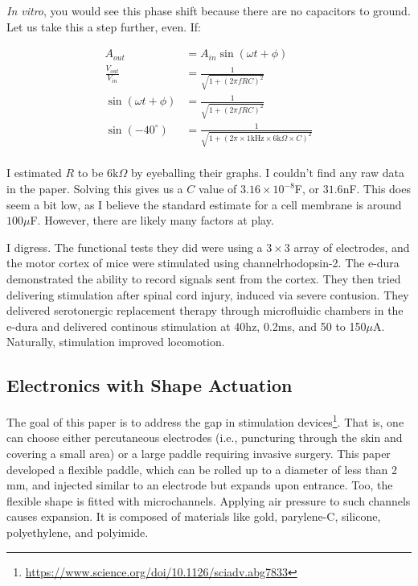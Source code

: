 \documentclass[12pt]{report}
\newcommand{\Vo}{{V}_{out}}
\newcommand{\Vi}{{V}_{in}}
\begin{document}
\textit{In vitro}, you would see this phase shift because there are no capacitors to ground. Let us take this a step further, even. If: 

\begin{equation} \label{court1}
\begin{split}
A_{out} &= A_{in}\sin(\omega t + \phi) \\
\frac{\Vo}{\Vi} &= \frac{1}{\sqrt{1 + (2\pi f RC)^2}} \\
\sin(\omega t + \phi) &= \frac{1}{\sqrt{1 + (2\pi f RC)^2}} \\
\sin(-40^{\circ}) &= \frac{1}{\sqrt{1 + (2\pi \times 1\mathrm{kHz} \times 6\mathrm{k}\Omega \times C)^2}} \\
\end{split}
\end{equation}

I estimated $R$ to be $6\mathrm{k}\Omega$ by eyeballing their graphs. I couldn't find any raw data in the paper. Solving this gives us a $C$ value of $3.16\times10^{-8}$F, or $31.6$nF. This does seem a bit low, as I believe the standard estimate for a cell membrane is around $100\mu$F. However, there are likely many factors at play.\newline

I digress. The functional tests they did were using a $3\times3$ array of electrodes, and the motor cortex of mice were stimulated using channelrhodopsin-2. The e-dura demonstrated the ability to record signals sent from the cortex. They then tried delivering stimulation after spinal cord injury, induced via severe contusion. They delivered serotonergic replacement therapy through microfluidic chambers in the e-dura and delivered continous stimulation at 40hz, 0.2ms, and 50 to 150$\mu$A. Naturally, stimulation improved locomotion. 

\subsection{Electronics with Shape Actuation}

The goal of this paper is to address the gap in stimulation devices\footnote{\url{https://www.science.org/doi/10.1126/sciadv.abg7833}}. That is, one can choose either percutaneous electrodes (i.e., puncturing through the skin and covering a small area) or a large paddle requiring invasive surgery. This paper developed a flexible paddle, which can be rolled up to a diameter of less than 2 mm, and injected similar to an electrode but expands upon entrance. Too, the flexible shape is fitted with microchannels. Applying air pressure to such channels causes expansion. It is composed of materials like gold, parylene-C, silicone, polyethylene, and polyimide.\newline 
\end{document}
